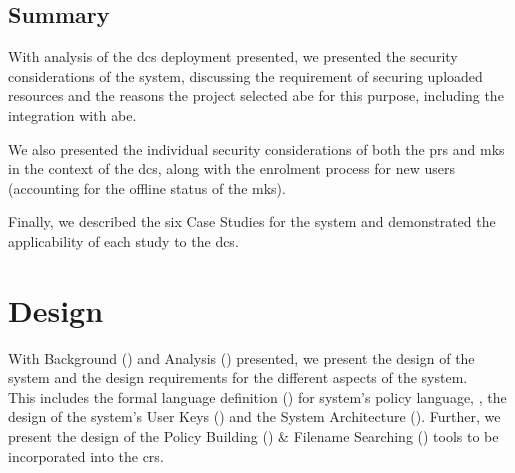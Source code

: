 \documentclass[british,table,svgnames,xcdraw]{l4proj}
\begin{document}


\section{Summary}
\label{sec:analysis_summary}

With analysis of the \acrfull{dcs} deployment presented, we presented the security considerations of the \theResServer system, discussing the requirement of securing uploaded resources and the reasons the project selected \acrfull{abe} for this purpose, including the integration with \acrshort{abe}.

We also presented the individual security considerations of both the \acrfull{prs} and \acrfull{mks} in the context of the \acrshort{dcs}, along with the enrolment process for new users (accounting for the offline status of the \acrshort{mks}).

Finally, we described the six Case Studies for the \theResServer system and demonstrated the applicability of each study to the \acrshort{dcs}.

\chapter{Design}
\label{ch:design}

With Background () and Analysis () presented, we present the design of the \theResServer system and the design requirements for the different aspects of the system.\\
This includes the formal language definition () for \theResServer system's policy language, \thePolicyLang, the design of the system's User Keys () and the System Architecture (). Further, we present the design of the Policy Building () \& Filename Searching () tools to be incorporated into the \acrfull{crs}.










\end{document}
